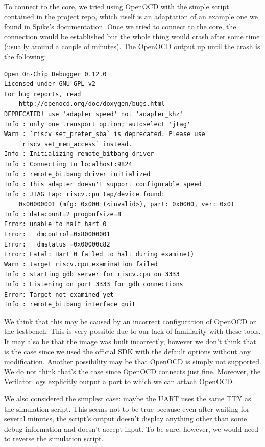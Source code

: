 \documentclass[a4paper,11pt]{article}
\begin{document}
To connect to the core, we tried using OpenOCD with the simple script contained
in the project repo, which itself is an adaptation of an example one we found in
\href{https://github.com/riscv-software-src/riscv-isa-sim?tab=readme-ov-file#debugging-with-gdb}{Spike's
documentation}. Once we tried to connect to the core, the connection would be
established but the whole thing would crash after some time (usually around a
couple of minutes). The OpenOCD output up until the crash is the following:

\begin{verbatim}
Open On-Chip Debugger 0.12.0
Licensed under GNU GPL v2
For bug reports, read
    http://openocd.org/doc/doxygen/bugs.html
DEPRECATED! use 'adapter speed' not 'adapter_khz'
Info : only one transport option; autoselect 'jtag'
Warn : `riscv set_prefer_sba` is deprecated. Please use
    `riscv set_mem_access` instead.
Info : Initializing remote_bitbang driver
Info : Connecting to localhost:9824
Info : remote_bitbang driver initialized
Info : This adapter doesn't support configurable speed
Info : JTAG tap: riscv.cpu tap/device found:
    0x00000001 (mfg: 0x000 (<invalid>), part: 0x0000, ver: 0x0)
Info : datacount=2 progbufsize=8
Error: unable to halt hart 0
Error:   dmcontrol=0x80000001
Error:   dmstatus =0x00000c82
Error: Fatal: Hart 0 failed to halt during examine()
Warn : target riscv.cpu examination failed
Info : starting gdb server for riscv.cpu on 3333
Info : Listening on port 3333 for gdb connections
Error: Target not examined yet
Info : remote_bitbang interface quit
\end{verbatim}

We think that this may be caused by an incorrect configuration of OpenOCD or the
testbench. This is very possible due to our lack of familiarity with these
tools. It may also be that the image was built incorrectly, however we don't
think that is the case since we used the official SDK with the default options
without any modification. Another possibility may be that OpenOCD is simply not
supported. We do not think that's the case since OpenOCD connects just fine.
Moreover, the Verilator logs explicitly output a port to which we can attach
OpenOCD.

We also considered the simplest case: maybe the UART uses the same TTY as the
simulation script. This seems not to be true because even after waiting for
several minutes, the script's output doesn't display anything other than some
debug information and doesn't accept input. To be sure, however, we would need
to reverse the simulation script.
\end{document}
